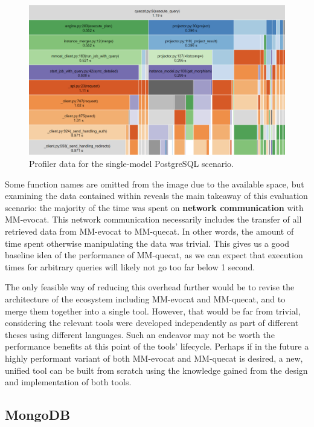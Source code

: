 \begin{figure}[h]
\centering
\includegraphics[width=\textwidth]{img/eval-postgre-profile.png} 
\caption{Profiler data for the single-model PostgreSQL scenario.}
\label{fig:evalpostgresqlprofile}
\end{figure}

Some function names are omitted from the image due to the available space, but examining the data contained within reveals the main takeaway of this evaluation scenario: the majority of the time was spent on \textbf{network communication} with MM-evocat.
This network communication necessarily includes the transfer of all retrieved data from MM-evocat to MM-quecat.
In other words, the amount of time spent otherwise manipulating the data was trivial.
This gives us a good baseline idea of the performance of MM-quecat, as we can expect that execution times for arbitrary queries will likely not go too far below 1 second.

The only feasible way of reducing this overhead further would be to revise the architecture of the ecosystem including MM-evocat and MM-quecat, and to merge them together into a single tool.
However, that would be far from trivial, considering the relevant tools were developed independently as part of different theses using different languages. Such an endeavor may not be worth the performance benefits at this point of the tools' lifecycle.
Perhaps if in the future a highly performant variant of both MM-evocat and MM-quecat is desired, a new, unified tool can be built from scratch using the knowledge gained from the design and implementation of both tools.

\subsection{MongoDB}
\label{eval:subsection:mongodb}

